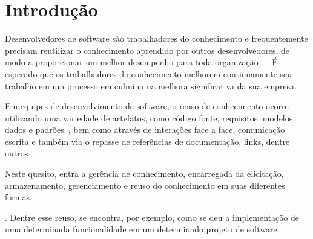 \chapter{Introdução}

Desenvolvedores de software são trabalhadores do conhecimento e frequentemente precisam reutilizar o conhecimento aprendido por outros desenvolvedores, de modo a proporcionar um melhor desempenho para toda organização~\cite{Druker1993}~\cite{Wiig2003}.
É esperado que os trabalhadores do conhecimento melhorem  continuamente seu trabalho em um processo em culmina na melhora significativa da sua empresa. ~\cite{Kavitha2011}


Em equipes de desenvolvimento de software, o reuso de conhecimento ocorre utilizando uma variedade de artefatos, como código fonte, requisitos, modelos, dados e padrões~\cite{Levy2009}, bem como através de interações face a face, comunicação escrita e também via o repasse de referências de documentação, links, dentre outros~\cite{Storey2014}~\cite{Olson2000}~\cite{CubraniC2004}

Neste quesito, entra a gerência de conhecimento, encarregada da elicitação, armazenamento, gerenciamento e reuso do conhecimento em suas diferentes formas.
.
Dentre esse reuso, se encontra, por exemplo, como se deu a implementação de uma determinada funcionalidade em um determinado projeto de software.




